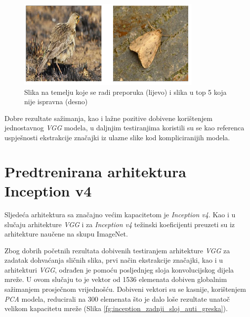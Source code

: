 \documentclass[times, utf8, proizvoljni, numeric]{fer}
\begin{document}
\begin{figure}[H]
\begin{center}
	\captionsetup{justification=centering}
	\includegraphics[width=0.8\textwidth]{./imgs/greske_vgg.png}
	\caption{Slika na temelju koje se radi preporuka (lijevo) i slika u top 5 koja nije ispravna (desno)}
	\label{fg:greske_vgg}
\end{center}
\end{figure}

Dobre rezultate sažimanja, kao i lažne pozitive dobivene korištenjem jednostavnog \textit{VGG} modela, u daljnjim testiranjima koristili su se kao referenca uspješnosti ekstrakcije značajki iz ulazne slike kod kompliciranijih modela.

\section{Predtrenirana arhitektura Inception v4}

Sljedeća arhitektura sa značajno većim kapacitetom je \textit{Inception v4}. Kao i u slučaju arhitekture \textit{VGG} i za \textit{Inception v4} težinski koeficijenti preuzeti su iz arhitekture naučene na skupu ImageNet.

Zbog dobrih početnih rezultata dobivenih testiranjem arhitekture \textit{VGG} za zadatak dohvaćanja sličnih slika, prvi način ekstrakcije značajki, kao i u arhitekturi \textit{VGG}, odrađen je pomoću posljednjeg sloja konvolucijskog dijela mreže. U ovom slučaju to je vektor od 1536 elemenata dobiven globalnim sažimanjem prosječnom vrijednošću. Dobiveni vektori su se kasnije, korištenjem \textit{PCA} modela, reducirali na 300 elemenata što je dalo loše rezultate unatoč velikom kapacitetu mreže (Slika \ref{fg:inception_zadnji_sloj_auti_greska}).
\end{document}
